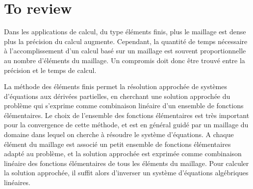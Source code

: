 \section{To review}











Dans les applications de calcul, du type éléments finis, plus le maillage est dense plus la précision du calcul augmente. Cependant, la quantité de temps nécessaire à l'accomplissement d'un calcul basé sur un maillage est souvent proportionnelle au nombre d'éléments du maillage. Un compromis doit donc être trouvé entre la précision et le temps de calcul. 



La méthode des éléments finis permet la résolution approchée de systèmes d'équations aux dérivées partielles, en cherchant une solution approchée du problème qui s'exprime comme combinaison linéaire d'un ensemble de fonctions élémentaires. Le choix de l'ensemble des fonctions élémentaires est très important pour la convergence de cette méthode, et est en général guidé par un maillage du domaine dans lequel on cherche à résoudre le système d'équations. A chaque élément du maillage est associé un petit ensemble de fonctions élémentaires adapté au problème, et la solution approchée est exprimée comme combinaison linéaire des fonctions élémentaires de tous les éléments du maillage. Pour calculer la solution approchée, il suffit alors d'inverser un système d'équations algébriques linéaires.
